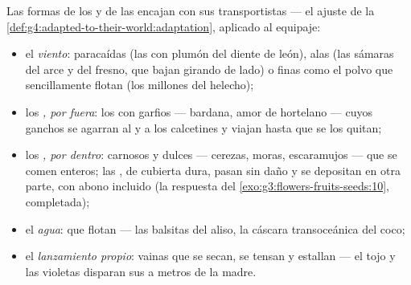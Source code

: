 \begin{proposition}\label{prop:g6:how-plants-spread:builds}
Las formas de los  y de las  encajan con sus
transportistas --- el ajuste de la
\cref{def:g4:adapted-to-their-world:adaptation}, aplicado al equipaje:
\begin{itemize}
  \item el \emph{viento}: paracaídas (las  con plumón del
        diente de león), alas (las sámaras del arce y del fresno, que
        bajan girando de lado) o  finas como el polvo que
        sencillamente flotan (los millones del helecho);
  \item los \emph{, por fuera}: los  con garfios ---
        bardana, amor de hortelano --- cuyos ganchos se agarran al 
        y a los calcetines y viajan hasta que se los quitan;
  \item los \emph{, por dentro}:  carnosos y dulces ---
        cerezas, moras, escaramujos --- que se comen enteros; las
        , de cubierta dura, pasan sin daño y se depositan en
        otra parte, con abono incluido (la respuesta del
        \cref{exo:g3:flowers-fruits-seeds:10}, completada);
  \item el \emph{agua}:  que flotan --- las balsitas del aliso,
        la cáscara transoceánica del coco;
  \item el \emph{lanzamiento propio}: vainas que se secan, se tensan y
        estallan --- el tojo y las violetas disparan sus  a
        metros de la madre.
\end{itemize}
\end{proposition}
\admitted

